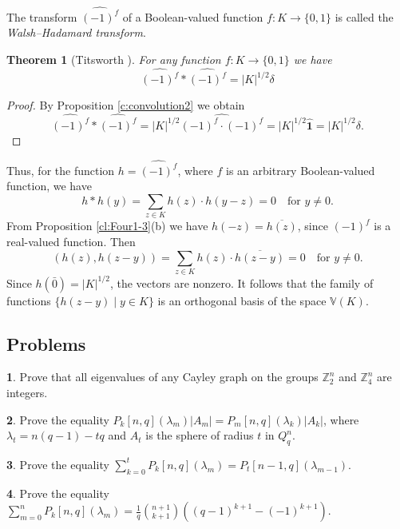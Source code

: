 \documentclass[11pt]{article}
\newtheorem{theorem}{Theorem}[section]
\theoremstyle{definition}
\newtheorem{exercise}{\quad}
\begin{document}
{{{%
 The transform $\widehat{(-1)^f}$ of a Boolean-valued function $f:K\rightarrow\{0,1\}$ is called the {\sl Walsh--Hadamard transform}.




\begin{theorem}[Titsworth \cite{Tits}]\label{th:Tits} For any function $f:K\rightarrow\{0,1\}$ we have
    \[
    \widehat{(-1)^f}*\widehat{(-1)^f}=|K|^{1/2}\delta
    \]
   \end{theorem}
\begin{proof}
By Proposition \ref{c:convolution2} we obtain
    \[
    \widehat{(-1)^f}*\widehat{(-1)^f}=|K|^{1/2}\widehat{(-1)^{f}
    \cdot(-1)^{f}}=|K|^{1/2} \widehat{\mathbf{1}}=|K|^{1/2} \delta.
    \]
\end{proof}

Thus, for the function $h= \widehat{(-1)^f}$, where $f$ is an arbitrary Boolean-valued function, we have
\[
h*h(y)=\sum\limits_{z\in K} h(z)\cdot h(y-z)=0\quad\text{for }y\ne 0.
\]
 From Proposition \ref{cl:Four1-3}(b) we have $h(-z)=\overline{h(z)}$, since $(-1)^f$ is a real-valued function. Then
\[
(h(z),h(z-y)) =\sum\limits_{z\in K} h(z)\cdot \overline{h(z-y)}=0\quad\text{for }y\ne 0.
\]
Since $h(\bar{0})=|K|^{1/2}$, the vectors are nonzero.
It follows that the family of functions $\{h(z-y) \mid y\in K\}$ is an orthogonal basis of the space $\mathbb{V}(K)$.


\subsection{Problems}

\begin{exercise}
Prove that all eigenvalues of any Cayley graph on the groups $\mathbb{Z}_2^n$ and $\mathbb{Z}_4^n$ are integers.
\end{exercise}

\begin{exercise}
Prove the equality $P_k[n,q](\lambda_m) |A_m|=P_m[n,q](\lambda_k) |A_k|$, where $\lambda_t=n(q-1)-tq$ and $A_t$ is the sphere of radius $t$ in $Q^n_q$.
\end{exercise}

\begin{exercise}
Prove the equality
$\sum\limits_{k=0}^tP_k[n,q](\lambda_m)=P_t[n-1,q](\lambda_{m-1})$.
\end{exercise}

\begin{exercise}
Prove the equality\\
$\sum\limits_{m=0}^nP_k[n,q](\lambda_m)=\frac{1}{q}{n+1 \choose
k+1}((q-1)^{k+1}-(-1)^{k+1})$.
\end{exercise}

}}}
\end{document}
